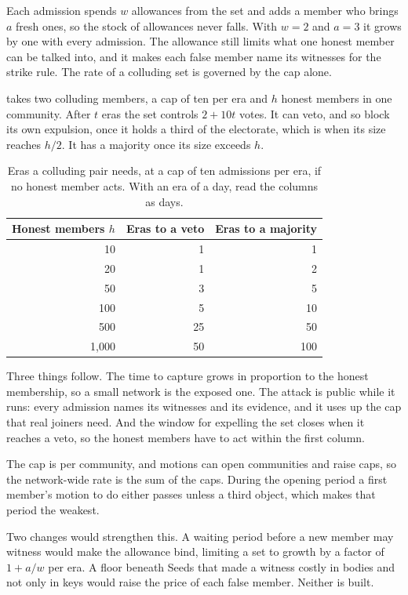 \documentclass[11pt,a4paper]{article}
\theoremstyle{definition}
\theoremstyle{plain}
\theoremstyle{remark}
\begin{document}
Each admission spends $w$ allowances from the set and adds a member who brings $a$ fresh ones, so the stock of allowances never falls. With $w = 2$ and $a = 3$ it grows by one with every admission. The allowance still limits what one honest member can be talked into, and it makes each false member name its witnesses for the strike rule. The rate of a colluding set is governed by the cap alone.

 takes two colluding members, a cap of ten per era and $h$ honest members in one community. After $t$ eras the set controls $2 + 10t$ votes. It can veto, and so block its own expulsion, once it holds a third of the electorate, which is when its size reaches $h/2$. It has a majority once its size exceeds $h$.

\begin{table}[h]
\centering
\caption{Eras a colluding pair needs, at a cap of ten admissions per era, if no honest member acts. With an era of a day, read the columns as days.}
\label{tab:attack}
\begin{tabular}{@{}rrr@{}}
\toprule
Honest members $h$ & Eras to a veto & Eras to a majority \\
\midrule
10 & 1 & 1 \\
20 & 1 & 2 \\
50 & 3 & 5 \\
100 & 5 & 10 \\
500 & 25 & 50 \\
1{,}000 & 50 & 100 \\
\bottomrule
\end{tabular}
\end{table}

Three things follow. The time to capture grows in proportion to the honest membership, so a small network is the exposed one. The attack is public while it runs: every admission names its witnesses and its evidence, and it uses up the cap that real joiners need. And the window for expelling the set closes when it reaches a veto, so the honest members have to act within the first column.

The cap is per community, and motions can open communities and raise caps, so the network-wide rate is the sum of the caps. During the opening period a first member's motion to do either passes unless a third object, which makes that period the weakest.

Two changes would strengthen this. A waiting period before a new member may witness would make the allowance bind, limiting a set to growth by a factor of $1 + a/w$ per era. A floor beneath Seeds that made a witness costly in bodies and not only in keys would raise the price of each false member. Neither is built.
\end{document}
